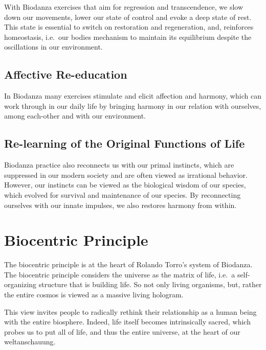 \documentclass[
  11pt,
]{book}
\begin{document}
With Biodanza exercises that aim for regression and transcendence, we slow down our movements, lower our state of control and evoke a deep state of rest. This state is essential to switch on restoration and regeneration, and, reinforces homeostasis, i.e.~our bodies mechanism to maintain its equilibrium despite the oscillations in our environment.

\hypertarget{affective-re-education}{%
\subsection{Affective Re-education}\label{affective-re-education}}

In Biodanza many exercises stimulate and elicit affection and harmony, which can work through in our daily life by bringing harmony in our relation with ourselves, among each-other and with our environment.

\hypertarget{re-learning-of-the-original-functions-of-life}{%
\subsection{Re-learning of the Original Functions of Life}\label{re-learning-of-the-original-functions-of-life}}

Biodanza practice also reconnects us with our primal instincts, which are suppressed in our modern society and are often viewed as irrational behavior.
However, our instincts can be viewed as the biological wisdom of our species, which evolved for survival and maintenance of our species. By reconnecting ourselves with our innate impulses, we also restores harmony from within.

\hypertarget{sectionBiocentricPrinciple}{%
\section{Biocentric Principle}\label{sectionBiocentricPrinciple}}

The biocentric principle is at the heart of Rolando Torro's system of Biodanza. The biocentric principle considers the universe as the matrix of life, i.e.~a self-organizing structure that is building life. So not only living organisms, but, rather the entire cosmos is viewed as a massive living hologram.

This view invites people to radically rethink their relationship as a human being with the entire biosphere. Indeed, life itself becomes intrinsically sacred, which probes us to put all of life, and thus the entire universe, at the heart of our weltanschauung.
\end{document}
